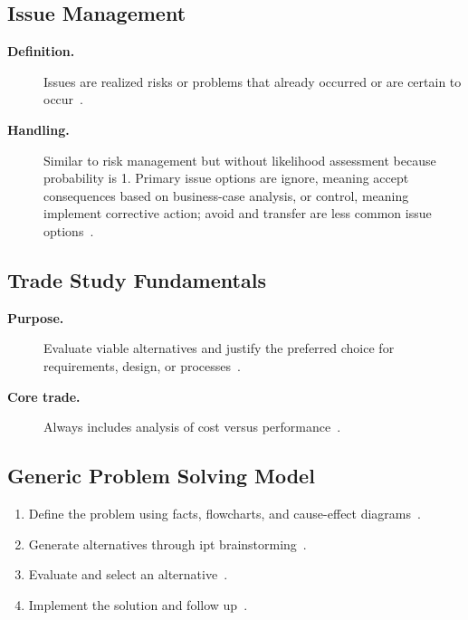 \documentclass[../main.tex]{subfiles}
\begin{document}
\subsection{Issue Management}
\begin{description}
  \item[\textbf{Definition.}] Issues are realized risks or problems that already occurred or are certain to occur~\autocite{edo-3-3-6-risk-management-problem-solving-2025}.
  \item[\textbf{Handling.}] Similar to risk management but without likelihood assessment because probability is 1. Primary issue options are ignore, meaning accept consequences based on business-case analysis, or control, meaning implement corrective action; avoid and transfer are less common issue options~\autocite{edo-3-3-6-risk-management-problem-solving-2025,DoD-RIO-Guide-2017}.
\end{description}

\subsection{Trade Study Fundamentals}
\begin{description}
  \item[\textbf{Purpose.}] Evaluate viable alternatives and justify the preferred choice for requirements, design, or processes~\autocite{edo-3-3-6-risk-management-problem-solving-2025}.
  \item[\textbf{Core trade.}] Always includes analysis of cost versus performance~\autocite{edo-3-3-6-risk-management-problem-solving-2025}.
\end{description}

\subsection{Generic Problem Solving Model}
\begin{enumerate}
  \item Define the problem using facts, flowcharts, and cause-effect diagrams~\autocite{edo-3-3-6-risk-management-problem-solving-2025}.
  \item Generate alternatives through \ac{ipt} brainstorming~\autocite{edo-3-3-6-risk-management-problem-solving-2025}.
  \item Evaluate and select an alternative~\autocite{edo-3-3-6-risk-management-problem-solving-2025}.
  \item Implement the solution and follow up~\autocite{edo-3-3-6-risk-management-problem-solving-2025}.
\end{enumerate}
\end{document}
